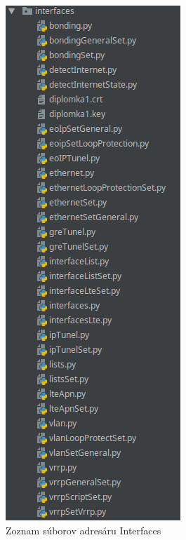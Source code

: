 \begin{figure}[H]
\centering
\includegraphics[scale=0.6]{../text/interfaces.png}
\caption{Zoznam súborov adresáru Interfaces}
\label{fig:iface}
\end{figure}
